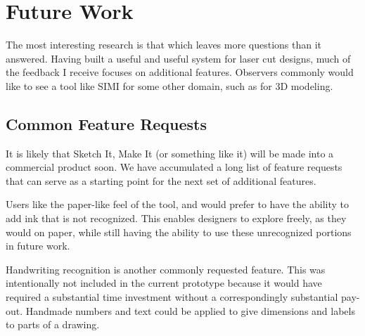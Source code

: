 


\section{Future Work}

The most interesting research is that which leaves more questions than
it answered. Having built a useful and useful system for laser cut
designs, much of the feedback I receive focuses on additional
features. Observers commonly would like to see a tool like SIMI for
some other domain, such as for 3D modeling.

\subsection{Common Feature Requests}

It is likely that Sketch It, Make It (or something like it) will be
made into a commercial product soon. We have accumulated a long list of feature
requests that can serve as a starting point for the next set of
additional features. 

Users like the paper-like feel of the tool, and would prefer to have
the ability to add ink that is not recognized. This enables designers
to explore freely, as they would on paper, while still having the
ability to use these unrecognized portions in future work.

Handwriting recognition is another commonly requested feature. This
was intentionally not included in the current prototype because it
would have required a substantial time investment without a
correspondingly substantial pay-out. Handmade numbers and text could be
applied to give dimensions and labels to parts of a drawing.

